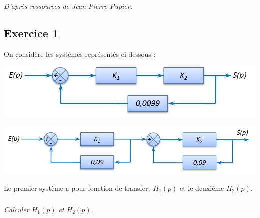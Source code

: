 \documentclass[11pt,oneside]{article}
\begin{document}
\begin{flushright}
\textit{D'après ressources de Jean-Pierre Pupier.} 
\end{flushright}
\vspace{.5cm}

\subsection*{Exercice 1}
On considère les systèmes représentés ci-dessous : 

\begin{minipage}[c]{.35\linewidth}
\begin{center}
\includegraphics[width=\textwidth]{png/fig_01}
\end{center}
\end{minipage}\hfill
\begin{minipage}[c]{.6\linewidth}
\begin{center}
\includegraphics[width=.9\textwidth]{png/fig_02}
\end{center}
\end{minipage}

\vspace{.5cm}

Le premier système a pour fonction de transfert $H_1(p)$ et le deuxième $H_2(p)$. 

\subparagraph{}
\textit{Calculer $H_1(p)$ et $H_2(p)$.}

\end{document}
